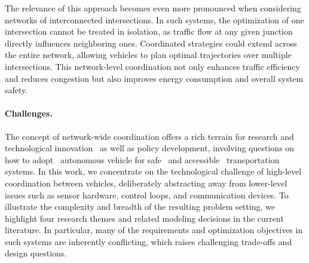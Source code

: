 \documentclass[a4paper]{report}
\theoremstyle{definition}
\theoremstyle{plain}
\begin{document}
The relevance of this approach becomes even more pronounced when considering
networks of interconnected intersections. In such systems, the optimization of
one intersection cannot be treated in isolation, as traffic flow at any given
junction directly influences neighboring ones. Coordinated strategies
could extend across the entire network, allowing vehicles to plan optimal
trajectories over multiple intersections. This network-level coordination not
only enhances traffic efficiency and reduces congestion but also improves energy
consumption and overall system safety.

\paragraph{Challenges.}

The concept of network-wide coordination offers a rich terrain for research and
technological
innovation~\cite{padmajaExplorationIssuesChallenges2023,yangAutonomousDrivingV2X2022}
as well as policy development, involving questions on how to
adopt~\cite{naisehTrustRiskPerception2025} autonomous vehicle for
safe~\cite{hilaryMakingAutomatedVehicles2022} and
accessible~\cite{fatimaEquityIssuesAssociated2024} transportation systems.
In this work, we concentrate on the technological challenge of high-level
coordination between vehicles, deliberately abstracting away from lower-level
issues such as sensor hardware, control loops, and communication devices.
To illustrate the complexity and breadth of the resulting problem setting, we
highlight four research themes and related modeling decisions in the current
literature. In particular, many of the requirements and optimization objectives
in such systems are inherently conflicting, which raises challenging trade-offs
and design questions.
\end{document}

